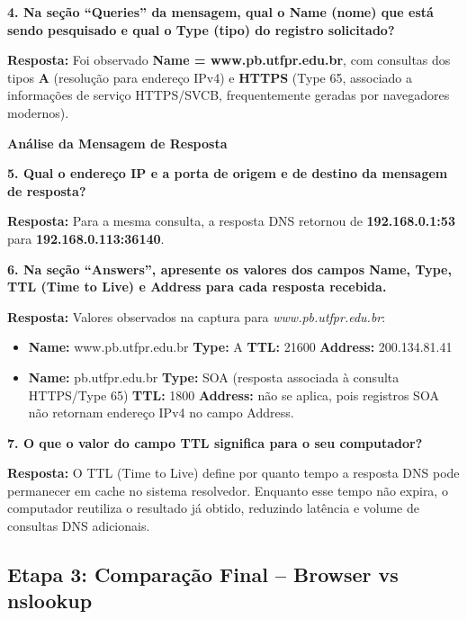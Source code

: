 \documentclass[12pt,a4paper]{article}
\newcommand{\resposta}[1]{\textbf{Resposta:} #1}
\begin{document}
\vspace{0.8em}
\noindent\textbf{4. Na seção ``Queries'' da mensagem, qual o Name (nome) que está sendo pesquisado e qual o Type (tipo) do registro solicitado?}

\resposta{Foi observado \textbf{Name = www.pb.utfpr.edu.br}, com consultas dos tipos \textbf{A} (resolução para endereço IPv4) e \textbf{HTTPS} (Type 65, associado a informações de serviço HTTPS/SVCB, frequentemente geradas por navegadores modernos).}

\vspace{0.8em}
\noindent\textbf{Análise da Mensagem de Resposta}

\noindent\textbf{5. Qual o endereço IP e a porta de origem e de destino da mensagem de resposta?}

\resposta{Para a mesma consulta, a resposta DNS retornou de \textbf{192.168.0.1:53} para \textbf{192.168.0.113:36140}.}

\vspace{0.8em}
\noindent\textbf{6. Na seção ``Answers'', apresente os valores dos campos Name, Type, TTL (Time to Live) e Address para cada resposta recebida.}

\resposta{Valores observados na captura para \textit{www.pb.utfpr.edu.br}:}

\begin{itemize}
  \item \textbf{Name:} www.pb.utfpr.edu.br \quad \textbf{Type:} A \quad \textbf{TTL:} 21600 \quad \textbf{Address:} 200.134.81.41
  \item \textbf{Name:} pb.utfpr.edu.br \quad \textbf{Type:} SOA (resposta associada à consulta HTTPS/Type 65) \quad \textbf{TTL:} 1800 \quad \textbf{Address:} não se aplica, pois registros SOA não retornam endereço IPv4 no campo Address.
\end{itemize}

\vspace{0.8em}
\noindent\textbf{7. O que o valor do campo TTL significa para o seu computador?}

\resposta{O TTL (Time to Live) define por quanto tempo a resposta DNS pode permanecer em cache no sistema resolvedor. Enquanto esse tempo não expira, o computador reutiliza o resultado já obtido, reduzindo latência e volume de consultas DNS adicionais.}

\subsection*{Etapa 3: Comparação Final -- Browser vs nslookup}
\end{document}
